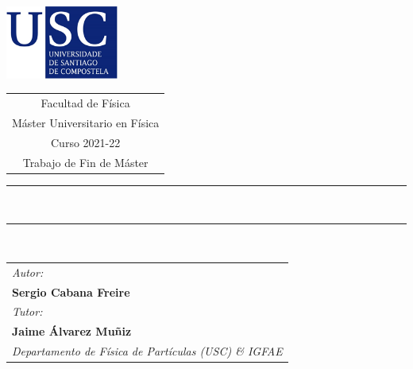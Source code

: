 \documentclass[12 pt, a4paper]{article} %
\numberwithin{equation}{section}
\numberwithin{figure}{section}
\numberwithin{table}{section}
\begin{document}
	\begin{center}
		\vspace{3em}
		\includegraphics[width=10em]{figures/USC.png}
		\hspace{1cm}
		\begin{tabular}[b]{c}
			{\large\color{usc} \sc Facultad de Física} \vspace{0.5em}\\
			{\large\color{usc} \sc Máster Universitario en Física} \vspace{0.5em}\\  %
			{\large\color{usc}  Curso 2021-22} \vspace{0.5em}\\%
			{\Large\color{usc} \sc Trabajo de Fin de Máster} %
		\end{tabular}
		
		
		
		\vspace{3cm}
		\rule{65mm}{0.2mm}\\
		\vspace{1cm}
		
		{\sc\LARGE \TituloDoTraballo}
		
		{\sl\large \EspecialidadeMaster}
		
		
		
		\vspace{0.5cm}
		\rule{65mm}{0.2mm}\\
		\vspace{2cm}
	\end{center}
	
	
	\begin{tabular}{l}
		{\sl\large Autor:} \\
		{\bf\Large Sergio Cabana Freire} %
		\vspace{1em}\mbox{} \\
		{\sl\large Tutor:} \\
		{\bf\large Jaime Álvarez Muñiz} \\
		{\sl\large Departamento de Física de Partículas (USC) \& IGFAE}
		\vspace{1em}\mbox{} \\
	\end{tabular}
	
\end{document}
